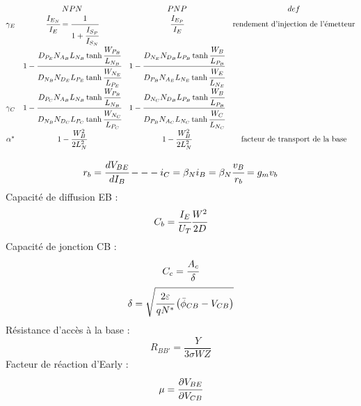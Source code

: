 \documentclass[10pt]{article}
\begin{document}
$$
\begin{matrix}
&NPN&PNP&def\\
\gamma_{E}&\cfrac{I_{E_{N}}}{I_{E}}=\cfrac{1}{1+\cfrac{I_{S_{P}}}{I_{S_{N}}}}&\cfrac{I_{E_{P}}}{I_{E}}&\text{rendement d'injection de l'émetteur}\\
&1-\cfrac{D_{P_{E}}N_{A_{B}}L_{N_{B}}\tanh\cfrac{W_{P_{B}}}{L_{N_{B}}}}{D_{N_{B}}N_{D_{E}}L_{P_{E}}\tanh\cfrac{W_{N_{E}}}{L_{P_{E}}}}&1-\cfrac{D_{N_{E}}N_{D_{B}}L_{P_{B}}\tanh\cfrac{W_{B}}{L_{P_{B}}}}{D_{P_{B}}N_{A_{E}}L_{N_{E}}\tanh\cfrac{W_{E}}{L_{N_{E}}}}&\\
\gamma_{C}&1-\cfrac{D_{P_{C}}N_{A_{B}}L_{N_{B}}\tanh\cfrac{W_{P_{B}}}{L_{N_{B}}}}{D_{N_{B}}N_{D_{C}}L_{P_{C}}\tanh\cfrac{W_{N_{C}}}{L_{P_{C}}}}&1-\cfrac{D_{N_{C}}N_{D_{B}}L_{P_{B}}\tanh\cfrac{W_{B}}{L_{P_{B}}}}{D_{P_{B}}N_{A_{C}}L_{N_{C}}\tanh\cfrac{W_{C}}{L_{N_{C}}}}&\\
\alpha^{*}&1-\cfrac{W_{B}^{2}}{2L_{N}^{2}}&1-\cfrac{W_{B}^{2}}{2L_{N}^{2}}&\text{facteur de transport de la base}\\
\end{matrix}
$$

$$r_{b}=\cfrac{dV_{BE}}{dI_{B}} --- i_{C}=\beta_{N}i_{B}=\beta_{N}\cfrac{v_{B}}{r_{b}}=g_{m}v_{b}$$
Capacité de diffusion EB : $$C_{b}=\cfrac{I_{E}}{U_{T}}\cfrac{W^{2}}{2D}$$
Capacité de jonction CB : $$C_{c}=\cfrac{A_{c}}{\delta}$$
$$\delta=\sqrt{\cfrac{2\varepsilon}{qN^{*}}\left(\bar\phi_{CB}-V_{CB}\right)}$$
Résistance d'accès à la base : $$R_{BB'}=\frac{Y}{3\sigma WZ}$$
Facteur de réaction d'Early : $$\mu=\cfrac{\partial V_{BE}}{\partial V_{CB}}$$
\end{document}
